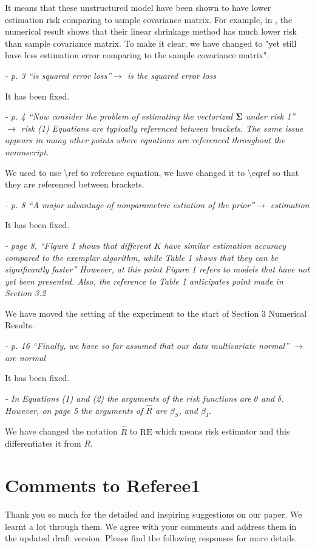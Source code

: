 \documentclass[12pt]{article}
\begin{document}
\begin{enumerate}
It means that these unstructured model have been shown to have lower estimation risk comparing to sample covariance matrix. For example, in \cite{ledoit2004}, the numerical result shows that their linear shrinkage method has much lower risk than sample covariance matrix. To make it clear, we have changed to "yet still have less estimation error comparing to the sample covariance matrix". 

\emph{- p. 3 “is squared error loss”$\to$ is the squared error loss}

It has been fixed.

\emph{- p. 4 “Now consider the problem of estimating the vectorized $\boldsymbol{\Sigma}$ under risk 1” $\to$ risk (1) Equations are typically referenced between brackets. The same issue appears in many other points where equations are referenced throughout the manuscript.}

We used to use \textbackslash ref to reference equation, we have changed it to \textbackslash eqref so that they are referenced between brackets.

\emph{- p. 8 “A major advantage of nonparametric estiation of the prior”$\to$ estimation}

It has been fixed.

\emph{- page 8, “Figure 1 shows that different $K$ have similar estimation accuracy compared to the exemplar algorithm, while Table 1 shows that they can be significantly faster” However, at this point Figure 1 refers to models that have not yet been presented. Also, the reference to Table 1 anticipates point made in Section 3.2}

We have moved the setting of the experiment to the start of Section 3 Numerical Results. 

\emph{- p. 16 “Finally, we have so far assumed that our data multivariate normal” $\to$ are normal}

It has been fixed.

\emph{- In Equations (1) and (2) the arguments of the risk functions are $\theta$ and $\delta$. However, on page 5 the arguments of $\hat{R}$ are $\beta_{S}$, and $\beta_{I}$.}

We have changed the notation $\hat{R}$ to $\text{RE}$ which means risk estimator and this differentiates it from $R$. 
\end{enumerate}

\section{Comments to Referee1}
Thank you so much for the detailed and inspiring suggestions on our paper. We learnt a lot through them. We agree with your comments and address them in the updated draft version. Please find the following responses for more details.
\end{document}
